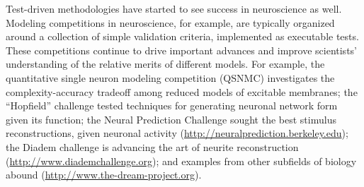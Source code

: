 \documentclass[9pt]{sig-alternate}
\begin{document}
Test-driven methodologies have started to see success in neuroscience as well. 
Modeling competitions in neuroscience, for example, are typically organized around a collection of simple validation criteria, implemented as executable tests. 
These competitions continue to drive important advances and improve scientists' understanding of the relative merits of different models. 
For example, the quantitative single neuron modeling competition (QSNMC) \cite{jolivet_quantitative_2008} investigates the complexity-accuracy tradeoff among reduced models of excitable membranes; 
the ``Hopfield'' challenge \cite{hopfield_what_2000} tested techniques for generating neuronal network form given its function; 
the Neural Prediction Challenge sought the best stimulus reconstructions, given neuronal activity (\url{http://neuralprediction.berkeley.edu}); the Diadem challenge is advancing the art of neurite reconstruction (\url{http://www.diademchallenge.org}); and 
examples from other subfields of biology abound (\url{http://www.the-dream-project.org}).
\end{document}
